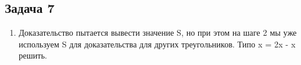 \documentclass[a4paper,12pt]{article}
\begin{document}
\subsection{Задача 7}
\begin{enumerate}
    \item Доказательство пытается вывести значение S, но при этом на шаге 2 мы уже используем S для доказательства для других треугольников. Типо x = 2x - x решить.
\end{enumerate}
\end{document}
